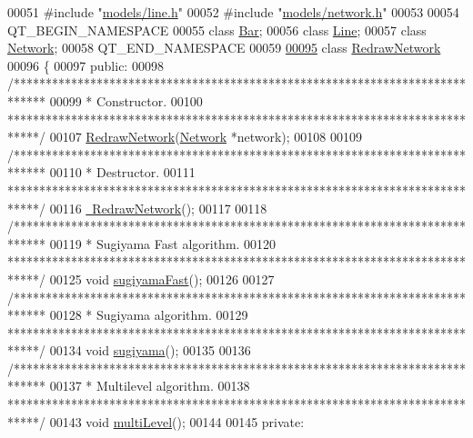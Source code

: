 \begin{DoxyCode}
00051 \textcolor{preprocessor}{#include "\hyperlink{line_8h}{models/line.h}"}
00052 \textcolor{preprocessor}{#include "\hyperlink{network_8h}{models/network.h}"}
00053 
00054 QT\_BEGIN\_NAMESPACE
00055 \textcolor{keyword}{class }\hyperlink{class_bar}{Bar};
00056 \textcolor{keyword}{class }\hyperlink{class_line}{Line};
00057 \textcolor{keyword}{class }\hyperlink{class_network}{Network};
00058 QT\_END\_NAMESPACE
00059 
\hypertarget{redrawnetwork_8h_source_l00095}{}\hyperlink{class_redraw_network}{00095} \textcolor{keyword}{class }\hyperlink{class_redraw_network}{RedrawNetwork}
00096 \{
00097 \textcolor{keyword}{public}:
00098   \textcolor{comment}{/*****************************************************************************}
00099 \textcolor{comment}{  * Constructor.}
00100 \textcolor{comment}{  *****************************************************************************/}
00107   \hyperlink{group___algorithms_ga1fe3edb8c57780eb62f7de8f03dfeda3}{RedrawNetwork}(\hyperlink{class_network}{Network} *network);
00108 
00109   \textcolor{comment}{/*****************************************************************************}
00110 \textcolor{comment}{  * Destructor.}
00111 \textcolor{comment}{  *****************************************************************************/}
00116   \hyperlink{group___algorithms_gac7b5f7fdb2b88e7d8bb580834e93b1e8}{~RedrawNetwork}();
00117 
00118   \textcolor{comment}{/*****************************************************************************}
00119 \textcolor{comment}{  * Sugiyama Fast algorithm.}
00120 \textcolor{comment}{  *****************************************************************************/}
00125   \textcolor{keywordtype}{void} \hyperlink{group___algorithms_ga94d53ddf8ee00c4ef6d56bb988333103}{sugiyamaFast}();
00126 
00127   \textcolor{comment}{/*****************************************************************************}
00128 \textcolor{comment}{  * Sugiyama algorithm.}
00129 \textcolor{comment}{  *****************************************************************************/}
00134   \textcolor{keywordtype}{void} \hyperlink{group___algorithms_gaee0ae606982145e66bba825421d610f8}{sugiyama}();
00135 
00136   \textcolor{comment}{/*****************************************************************************}
00137 \textcolor{comment}{  * Multilevel algorithm.}
00138 \textcolor{comment}{  *****************************************************************************/}
00143   \textcolor{keywordtype}{void} \hyperlink{group___algorithms_ga56a92ad06ae0198ee60160aa66aa0ce1}{multiLevel}();
00144 
00145 \textcolor{keyword}{private}:

\end{DoxyCode}
